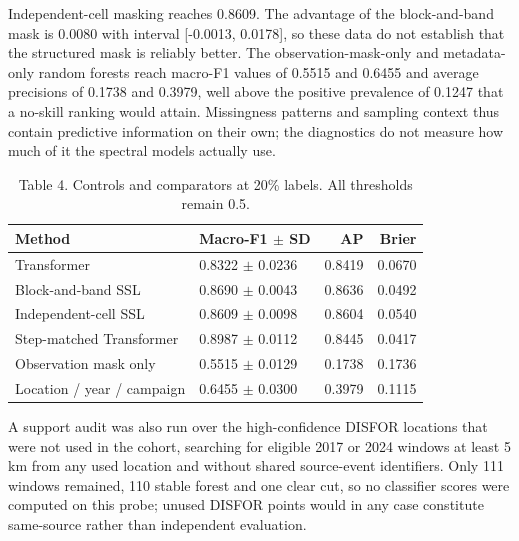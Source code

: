\documentclass[11pt,a4paper]{article}
\begin{document}
Independent-cell masking reaches 0.8609. The advantage of the block-and-band mask is 0.0080 with interval [-0.0013, 0.0178], so these data do not establish that the structured mask is reliably better. The observation-mask-only and metadata-only random forests reach macro-F1 values of 0.5515 and 0.6455 and average precisions of 0.1738 and 0.3979, well above the positive prevalence of 0.1247 that a no-skill ranking would attain. Missingness patterns and sampling context thus contain predictive information on their own; the diagnostics do not measure how much of it the spectral models actually use.

\begin{table}[htbp]
\centering

\caption{Table 4. Controls and comparators at 20\% labels. All thresholds remain 0.5.}
\begin{tabular}{llrr}
\toprule
Method & Macro-F1 $\pm$ SD & AP & Brier \\ \midrule
Transformer & 0.8322 $\pm$ 0.0236 & 0.8419 & 0.0670 \\
Block-and-band SSL & 0.8690 $\pm$ 0.0043 & 0.8636 & 0.0492 \\
Independent-cell SSL & 0.8609 $\pm$ 0.0098 & 0.8604 & 0.0540 \\
Step-matched Transformer & 0.8987 $\pm$ 0.0112 & 0.8445 & 0.0417 \\
Observation mask only & 0.5515 $\pm$ 0.0129 & 0.1738 & 0.1736 \\
Location / year / campaign & 0.6455 $\pm$ 0.0300 & 0.3979 & 0.1115 \\
\bottomrule
\end{tabular}
\end{table}

A support audit was also run over the high-confidence DISFOR locations that were not used in the cohort, searching for eligible 2017 or 2024 windows at least 5 km from any used location and without shared source-event identifiers. Only 111 windows remained, 110 stable forest and one clear cut, so no classifier scores were computed on this probe; unused DISFOR points would in any case constitute same-source rather than independent evaluation.
\end{document}
